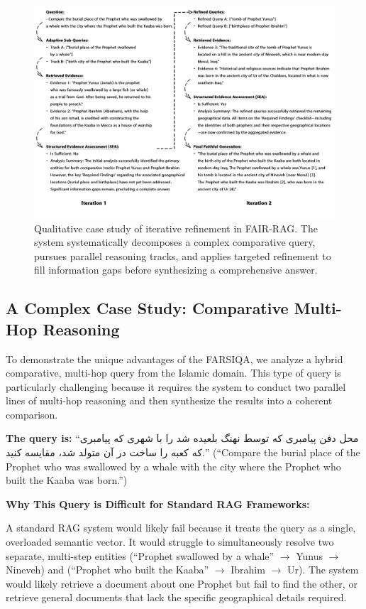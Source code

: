 \documentclass[11pt]{article}
\newcommand{\fa}[1]{\textfarsi{#1}}
\begin{document}
\begin{figure}[t]
\centering
\includegraphics[width=\textwidth]{figure_4.png}
\caption{Qualitative case study of iterative refinement in FAIR-RAG. The system systematically decomposes a complex comparative query, pursues parallel reasoning tracks, and applies targeted refinement to fill information gaps before synthesizing a comprehensive answer.}
\label{fig:case-study-iterative}
\end{figure}

\subsection{A Complex Case Study: Comparative Multi-Hop Reasoning}

To demonstrate the unique advantages of the FARSIQA, we analyze a hybrid comparative, multi-hop query from the Islamic domain. This type of query is particularly challenging because it requires the system to conduct two parallel lines of multi-hop reasoning and then synthesize the results into a coherent comparison.

  \textbf{The query is:} ``\fa{محل دفن پیامبری که توسط نهنگ بلعیده شد را با شهری که پیامبری که کعبه را ساخت در آن متولد شد، مقایسه کنید.}'' (``Compare the burial place of the Prophet who was swallowed by a whale with the city where the Prophet who built the Kaaba was born.'')

\textbf{Why This Query is Difficult for Standard RAG Frameworks:}

A standard RAG system would likely fail because it treats the query as a single, overloaded semantic vector. It would struggle to simultaneously resolve two separate, multi-step entities (``Prophet swallowed by a whale'' $\rightarrow$ Yunus $\rightarrow$ Nineveh) and (``Prophet who built the Kaaba'' $\rightarrow$ Ibrahim $\rightarrow$ Ur). The system would likely retrieve a document about one Prophet but fail to find the other, or retrieve general documents that lack the specific geographical details required.
\end{document}
